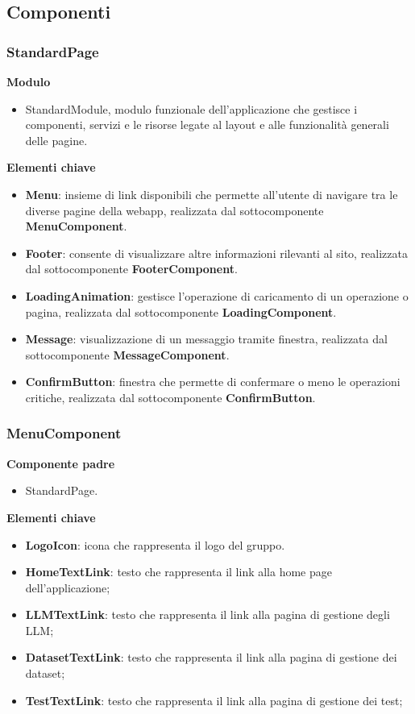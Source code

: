 \subsection{Componenti}
\label{subsec:Componenti}
\subsubsection{StandardPage}
\textbf{Modulo}
\begin{itemize}
    \item StandardModule, modulo funzionale dell'applicazione che gestisce i componenti, servizi e le risorse legate al layout e alle funzionalità generali delle pagine.
\end{itemize}
\textbf{Elementi chiave}
\begin{itemize}
    \item \textbf{Menu}: insieme di link disponibili che permette all'utente di navigare tra le diverse pagine della webapp, realizzata dal sottocomponente \textbf{MenuComponent}.
    \item \textbf{Footer}: consente di visualizzare altre informazioni rilevanti al sito, realizzata dal sottocomponente \textbf{FooterComponent}.
    \item \textbf{LoadingAnimation}: gestisce l'operazione di caricamento di un operazione o pagina, realizzata dal sottocomponente \textbf{LoadingComponent}.
    \item \textbf{Message}: visualizzazione di un messaggio tramite finestra, realizzata dal sottocomponente \textbf{MessageComponent}.
    \item \textbf{ConfirmButton}: finestra che permette di confermare o meno le operazioni critiche, realizzata dal sottocomponente \textbf{ConfirmButton}.
\end{itemize}
\subsubsection{MenuComponent}
\textbf{Componente padre}
\begin{itemize}
    \item StandardPage.
\end{itemize}
\textbf{Elementi chiave}
\begin{itemize}
    \item \textbf{LogoIcon}:  icona che rappresenta il logo del gruppo.
    \item \textbf{HomeTextLink}: testo che rappresenta il link alla home page dell'applicazione;
    \item \textbf{LLMTextLink}: testo che rappresenta il link alla pagina di gestione degli LLM;
    \item \textbf{DatasetTextLink}: testo che rappresenta il link alla pagina di gestione dei dataset;
    \item \textbf{TestTextLink}: testo che rappresenta il link alla pagina di gestione dei test;
\end{itemize}
